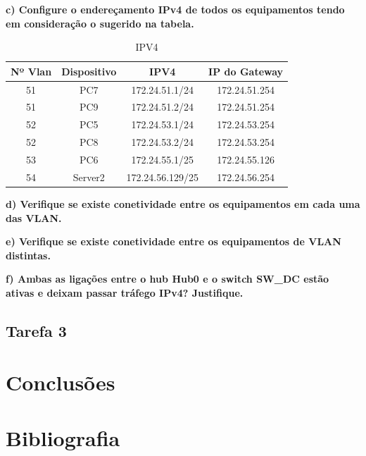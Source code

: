 \documentclass[11pt,english, openright, oneside]{book}
\newcommand\blankpage{%
    \null
    \thispagestyle{empty}%
    \newpage}
\begin{document}
\vspace{0.8cm}

\textbf{c) Configure o endereçamento IPv4 de todos os equipamentos tendo em consideração o sugerido na tabela. }
\vspace{0.2cm}

\begin{table}[h!]
\centering
\begin{tabular}{|c|c|c|c|}
\hline
\textbf{Nº Vlan} & \textbf{Dispositivo} & \textbf{IPV4} & \textbf{IP do Gateway}\\
\hline
51 & PC7 & 172.24.51.1/24 & 172.24.51.254\\
51 & PC9 & 172.24.51.2/24 & 172.24.51.254\\
52 & PC5 & 172.24.53.1/24 & 172.24.53.254\\
52 & PC8 & 172.24.53.2/24 & 172.24.53.254\\
53 & PC6 & 172.24.55.1/25 & 172.24.55.126\\
54 & Server2 & 172.24.56.129/25 & 172.24.56.254\\
\hline
\end{tabular}
\caption{IPV4}
\label{tab:ips}
\end{table}
    
\vspace{0.8cm}

\textbf{d) Verifique se existe conetividade entre os equipamentos em cada uma das VLAN.}
\vspace{0.2cm}

\vspace{0.8cm}

\textbf{e) Verifique se existe conetividade entre os equipamentos de VLAN distintas.}
\vspace{0.2cm}

\vspace{0.8cm}

\textbf{f) Ambas as ligações entre o hub Hub0 e o switch  SW\_DC estão ativas e deixam passar tráfego IPv4? Justifique.}
\vspace{0.2cm}

\vspace{0.8cm}

\pagebreak


\section{Tarefa 3}

\pagebreak

\chapter{Conclusões}



\chapter{Bibliografia}



\mainmatter



\afterpage{\blankpage}
\end{document}
